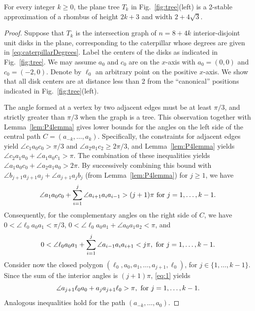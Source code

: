 \documentclass[runningheads]{article}
\begin{document}
\setcounter{lemma}{2}
\begin{lemma}\label{lem:stableTree}
For every integer $k\geq 0$, the plane tree $T_k$ in Fig.~\ref{fig:tree}(left)
is a 2-stable approximation of a rhombus of height $2k+3$ and width $2+4\sqrt{3}$.
\end{lemma}
%
\begin{proof}
Suppose that $T_k$ is the intersection graph of $n=8+4k$ interior-disjoint unit disks
in the plane, corresponding to the caterpillar whose degrees are given
in \eqref{eq:caterpillarDegrees}.
Label the centers of the disks as indicated in Fig.~\ref{fig:tree}.
We may assume $a_0$ and $c_0$ are on the $x$-axis with $a_0=(0,0)$ and $c_0=(-2,0)$.
Denote by $\ell_0$ an arbitrary point on the positive $x$-axis. We show that all
disk centers are at distance less than 2 from the ``canonical'' positions indicated
in Fig.~\ref{fig:tree}(left).

The angle formed at a vertex by two adjacent edges must be at least $\pi/3$,
and strictly greater than $\pi/3$ when the graph is a tree.
This observation together with Lemma~\ref{lem:P4lemma} gives lower bounds for the
angles on the left side of the central path $C=(a_{-k},\ldots , a_k)$.
Specifically, the constraints for adjacent edges yield $\angle c_1a_0c_0>\pi/3$ and $\angle a_2a_1c_2\geq 2\pi/3$, and Lemma~\ref{lem:P4lemma} yields $\angle c_2a_1a_0 +\angle a_1a_0c_1>\pi$. The combination of these inequalities yields $\angle a_1a_0c_0+\angle a_2a_1a_0 > 2\pi$. By successively combining this bound with
$\angle b_{j+1}a_{j+1}a_j+\angle a_{j+1}a_jb_j$ (from Lemma~\ref{lem:P4lemma}) for $j\geq 1$, we have
\begin{equation}
\angle a_1a_0c_0 +\sum_{i=1}^j \angle a_{i+1}a_ia_{i-1}> (j+1) \pi
\,\, \mbox{\rm for } j=1,\ldots , k-1.\nonumber
\end{equation}
Consequently, for the complementary angles on the right side of $C$, we have
$0<\angle \ell_0 a_0a_1<\pi/3$, $0<\angle \ell_0a_0a_1+\angle a_0a_1a_2<\pi$, and
\begin{equation}\label{eq:1}
0< \angle \ell_0a_0a_1+\sum_{i=1}^j \angle a_{i-1}a_ia_{i+1}< j \pi,
\,\, \mbox{\rm for } j=1,\ldots , k-1.
\end{equation}
Consider now the closed polygon $(\ell_0, a_0, a_1, \ldots , a_{j+1}, \ell_0)$,
for $j \in \{1, \ldots, k-1\}$. Since the sum of the interior angles is
$(j+1)\pi$, \eqref{eq:1} yields
\begin{equation}\label{eq:2}
\angle a_{j+1}\ell_0a_0 + a_ja_{j+1}\ell_0 > \pi ,
\,\, \mbox{\rm for } j=1,\ldots , k-1.
\end{equation}
Analogous inequalities hold for the path $(a_{-k},\ldots, a_0)$.


\end{proof}
\end{document}
